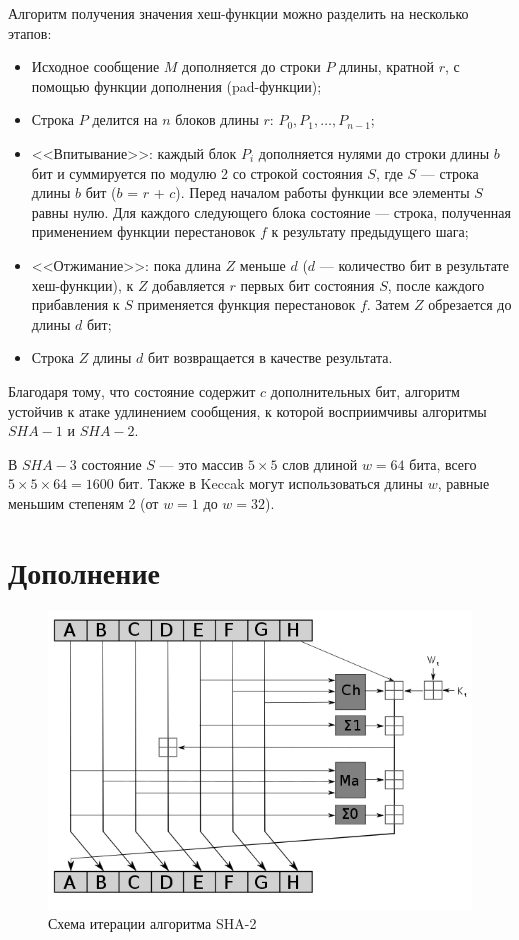 \documentclass{book}
\begin{document}
Алгоритм получения значения хеш-функции можно разделить на несколько этапов:
\begin{itemize}
    \item Исходное сообщение $M$ дополняется до строки $P$ длины, кратной $r$, с помощью функции дополнения (pad-функции);
    \item Строка $P$ делится на $n$ блоков длины $r$: $P_{0},P_{1},\ldots,P_{n-1}$;
    \item <<Впитывание>>: каждый блок $P_{i}$ дополняется нулями до строки длины $b$ бит и суммируется по модулю 2 со строкой состояния $S$, где $S$ --- строка длины $b$ бит ($b$ = $r$ + $c$). Перед началом работы функции все элементы $S$ равны нулю. Для каждого следующего блока состояние --- строка, полученная применением функции перестановок $f$ к результату предыдущего шага;
    \item  <<Отжимание>>: пока длина $Z$ меньше $d$ ($d$ — количество бит в результате хеш-функции), к $Z$ добавляется $r$ первых бит состояния $S$, после каждого прибавления к $S$ применяется функция перестановок $f$. Затем $Z$ обрезается до длины $d$ бит;
    \item Строка $Z$ длины $d$ бит возвращается в качестве результата.
\end{itemize}


Благодаря тому, что состояние содержит $c$ дополнительных бит, алгоритм устойчив к атаке удлинением сообщения, к которой восприимчивы алгоритмы $SHA-1$ и $SHA-2$.



В $SHA-3$ состояние $S$ --- это массив $5 × 5$ слов длиной $w = 64$ бита, всего $5 × 5 × 64 = 1600$ бит. Также в Keccak могут использоваться длины $w$, равные меньшим степеням 2 (от $w = 1$ до $w = 32$).
\section*{Дополнение}

 \begin{figure}[h]
    \centering
    \includegraphics[scale=0.25]{pics/600px-SHA-2.svg.png}
    \caption{Схема итерации алгоритма SHA-2}
\end{figure}
\end{document}
